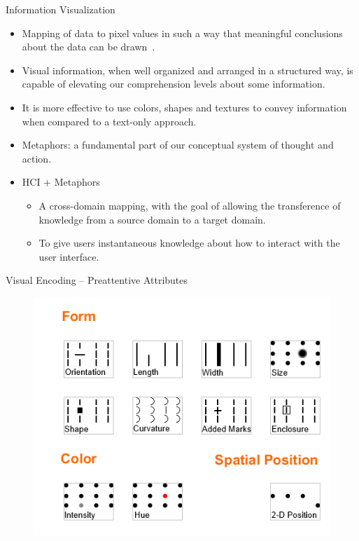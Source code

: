 \documentclass[handout]{beamer}
\begin{document}
\begin{frame}[allowframebreaks]{Information Visualization}

    \begin{itemize}
        \item Mapping of data to pixel values in such a way that meaningful
        conclusions about the data can be drawn~\cite{erik2008color}.
        \item Visual information, when well organized and arranged in a
        structured way, is capable of elevating our comprehension levels about
        some information.
        \item It is more effective to use colors, shapes and textures to convey
        information when compared to a text-only approach.
        \framebreak
        \item Metaphors: a fundamental part of our conceptual system of thought
        and action.
        \item HCI + Metaphors
        \begin{itemize}
            \item A cross-domain mapping, with the goal of allowing the
            transference of knowledge from a source domain to a target domain.
            \item To give users instantaneous knowledge about how to interact
            with the user interface.
        \end{itemize}
    \end{itemize}

\end{frame}

\begin{frame}{Visual Encoding -- Preattentive Attributes}
    \begin{figure}
        \includegraphics[width=.8\linewidth]{../figures/ali-encodings}
    \end{figure}
\end{frame}
\end{document}
